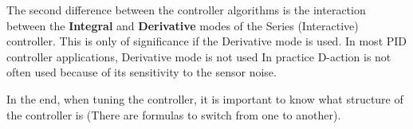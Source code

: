 
The second difference between the controller algorithms is the interaction between the \textbf{Integral} and \textbf{Derivative} modes of the Series (Interactive) controller. This is only of significance if the Derivative mode is used. In most PID controller applications, Derivative mode is not used  In practice D-action is not often used because of its sensitivity to the sensor noise. 


In the end, when tuning the controller, it is important to know what structure of the controller is (There are formulas to switch from one to another).


\newpage
